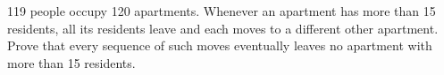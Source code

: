119 people occupy 120 apartments. Whenever an apartment has more than 15 residents, all its residents leave and each moves to a different other apartment. Prove that every sequence of such moves eventually leaves no apartment with more than 15 residents.
